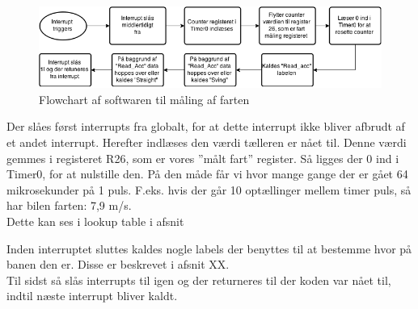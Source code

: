 \begin{figure}[h!]
\center
\includegraphics[scale=0.65]{./Graphics/fart_chart}
\caption{Flowchart af softwaren til måling af farten}
\label{fart_chart}
\end{figure}

Der slåes først interrupts fra globalt, for at dette interrupt ikke bliver afbrudt af et andet interrupt. Herefter indlæses den værdi tælleren er nået til. Denne værdi gemmes i registeret R26, som er vores ”målt fart” register. Så ligges der 0 ind i Timer0, for at nulstille den. På den måde får vi hvor mange gange der er gået 64 mikrosekunder på 1 puls. F.eks. hvis der går 10 optællinger mellem timer puls, så har bilen farten: 7,9 m/s. \\
Dette kan ses i lookup table i afsnit 

Inden interruptet sluttes kaldes nogle labels der benyttes til at bestemme hvor på banen den er. Disse er beskrevet i afsnit XX.  \\

Til sidst så slås interrupts til igen og der returneres til der koden var nået til, indtil næste interrupt bliver kaldt.  
